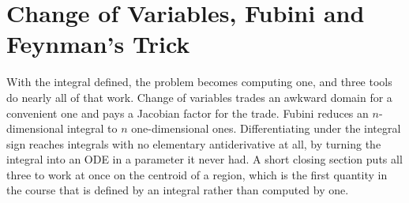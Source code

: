 \chapter{Change of Variables, Fubini and Feynman's Trick}
\label{ch:change_of_variables}

With the integral defined, the problem becomes computing one, and three tools do nearly all of
that work. Change of variables trades an awkward domain for a convenient one and pays a Jacobian
factor for the trade. Fubini reduces an $n$-dimensional integral to $n$ one-dimensional ones.
Differentiating under the integral sign reaches integrals with no elementary antiderivative at
all, by turning the integral into an ODE in a parameter it never had. A short closing section puts
all three to work at once on the centroid of a region, which is the first quantity in the course
that is defined by an integral rather than computed by one.






